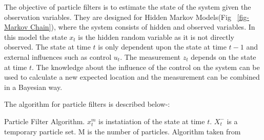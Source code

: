 \documentclass[12pt]{dalcsthesis}
\begin{document}
The objective of particle filters is to estimate the state of the system given the observation variables. They are designed for Hidden Markov Models(Fig ~\ref{fig-Markov Chain}), where the system consists of hidden and observed variables. In this model the state $x_{t}$ is the hidden random variable as it is not directly observed. The state at time $t$ is only dependent upon the state at time $t-1$ and external influences such as control $u_{t}$. The measurement $z_{t}$ depends on the state at time $t$. The knowledge about the influence of the control on the system can be used to calculate a new expected location and the measurement can be combined in a Bayesian way.

The algorithm for particle filters is described below-:

\begin{algorithm}[H]
\label{alg:ParticleFilter}
 \SetAlgoLined
  		 


\caption{Particle Filter Algorithm. $x_{t}^{m}$ is instatiation of the state at time $t$. $X_{t}^{-}$ is a temporary particle set. M is the number of particles. Algorithm taken from \cite{thrun2005probabilistic}}
\end{algorithm}
\end{document}
